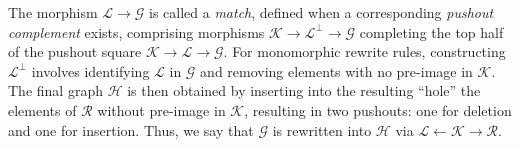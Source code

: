 
The morphism $\mathcal L \to \mathcal G$ is called a \textit{match}, defined when a corresponding \textit{pushout complement} exists, comprising morphisms $\mathcal K \to \mathcal{L}^\bot \to \mathcal G$ completing the top half of the pushout square $\mathcal K \to \mathcal L \to \mathcal G$. 
For monomorphic rewrite rules, constructing $\mathcal{L}^\bot$ involves identifying $\mathcal L$ in $\mathcal G$ and removing elements with no pre-image in $\mathcal K$. 
The final graph $\mathcal H$ is then obtained by inserting into the resulting ``hole'' the elements of $\mathcal R$ without pre-image in $\mathcal K$, resulting in two pushouts: one for deletion and one for insertion. 
Thus, we say that $\mathcal G$ is rewritten into $\mathcal H$ via $\mathcal L \xleftarrow{} \mathcal K \xrightarrow{} \mathcal R$.

